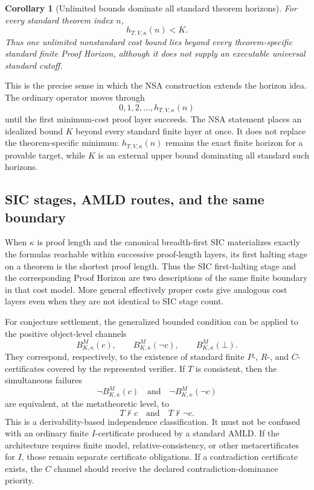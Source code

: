 \documentclass[11pt]{article}
\newtheorem{corollary}[theorem]{Corollary}
\theoremstyle{definition}
\theoremstyle{remark}
\begin{document}
\begin{corollary}[Unlimited bounds dominate all standard theorem horizons]\label{cor:horizondominance}
For every standard theorem index $n$,
\[
h_{T,V,\kappa}(n)<K.
\]
Thus one unlimited nonstandard cost bound lies beyond every theorem-specific standard finite Proof Horizon, although it does not supply an executable universal standard cutoff.
\end{corollary}

This is the precise sense in which the NSA construction extends the horizon idea. The ordinary operator moves through
\[
0,1,2,\ldots,h_{T,V,\kappa}(n)
\]
until the first minimum-cost proof layer succeeds. The NSA statement places an idealized bound $K$ beyond every standard finite layer at once. It does not replace the theorem-specific minimum: $h_{T,V,\kappa}(n)$ remains the exact finite horizon for a provable target, while $K$ is an external upper bound dominating all standard such horizons.

\subsection{SIC stages, AMLD routes, and the same boundary}
When $\kappa$ is proof length and the canonical breadth-first SIC materializes exactly the formulas reachable within successive proof-length layers, its first halting stage on a theorem is the shortest proof length. Thus the SIC first-halting stage and the corresponding Proof Horizon are two descriptions of the same finite boundary in that cost model. More general effectively proper costs give analogous cost layers even when they are not identical to SIC stage count.

For conjecture settlement, the generalized bounded condition can be applied to the positive object-level channels
\[
B^M_{K,\kappa}(c),
\qquad
B^M_{K,\kappa}(\neg c),
\qquad
B^M_{K,\kappa}(\bot).
\]
They correspond, respectively, to the existence of standard finite $P$-, $R$-, and $C$-certificates covered by the represented verifier. If $T$ is consistent, then the simultaneous failures
\[
\neg B^M_{K,\kappa}(c)
\quad\text{and}\quad
\neg B^M_{K,\kappa}(\neg c)
\]
are equivalent, at the metatheoretic level, to
\[
T\nvdash c
\quad\text{and}\quad
T\nvdash\neg c.
\]
This is a derivability-based independence classification. It must not be confused with an ordinary finite $I$-certificate produced by a standard AMLD. If the architecture requires finite model, relative-consistency, or other metacertificates for $I$, those remain separate certificate obligations. If a contradiction certificate exists, the $C$ channel should receive the declared contradiction-dominance priority.
\end{document}
